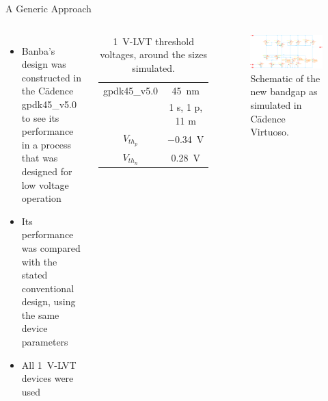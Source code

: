 \documentclass[aspectratio=1610]{beamer} %
\begin{document}
\begin{frame}{A Generic Approach}{}

    \begin{columns}[c]
        \begin{itemize}
            \item Banba's design was constructed in the C\=adence gpdk45\_v5.0 to see its performance in a process that was designed for low voltage operation
            \item Its performance was compared with the stated conventional design, using the same device parameters
            \item All \qty{1}{\V}-LVT devices were used
        \end{itemize}
        \begin{table}[]
            \centering
            \begin{tabular}{c|c}
            \toprule
                gpdk45\_v5.0 & \qty{45}{\nm} \\
                & 1 s, 1 p, 11 m \\
            \midrule
                \(V_{th_p}\) & \qty{-0.34}{\V} \\
                \(V_{th_n}\) & \qty{0.28}{\V} \\
            \bottomrule
            \end{tabular}
            \caption{\qty{1}{\V}-LVT threshold voltages, around the sizes simulated.}
            \label{tab:sim_th}
        \end{table}
    
        \begin{figure}
            \includegraphics[width=\columnwidth]{bg_prop.eps}
            \caption{Schematic of the new bandgap as simulated in C\=adence Virtuoso.}\label{fig:gpdk_prop}
        \end{figure}
    \end{columns}
\end{frame}
\end{document}
